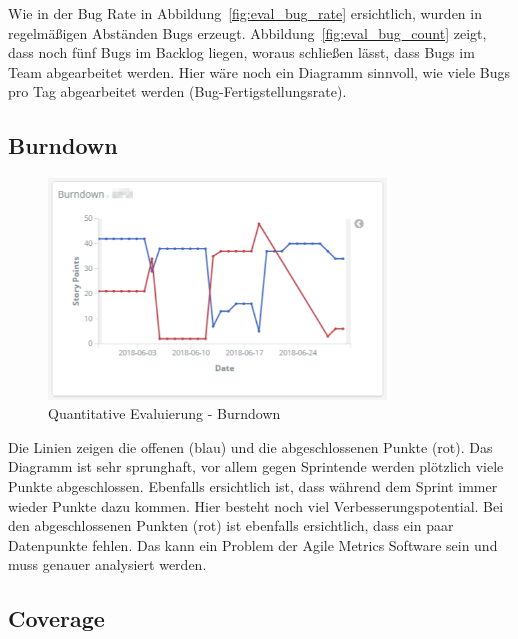 Wie in der Bug Rate in Abbildung~\ref{fig:eval_bug_rate} ersichtlich, wurden in regelmäßigen Abständen Bugs erzeugt.
Abbildung~\ref{fig:eval_bug_count} zeigt, dass noch fünf Bugs im Backlog liegen, woraus schließen lässt, dass Bugs im Team abgearbeitet werden.
Hier wäre noch ein Diagramm sinnvoll, wie viele Bugs pro Tag abgearbeitet werden (Bug-Fertigstellungsrate).

\clearpage
\subsection*{Burndown}

\begin{savenotes}
    \begin{figure}[H]
      \centering
      \includegraphics[width=0.8\textwidth]{img/eval-burndown.png}
      \caption{Quantitative Evaluierung {-} Burndown}\label{fig:eval_burndown}
    \end{figure}
\end{savenotes}

Die Linien zeigen die offenen (blau) und die abgeschlossenen Punkte (rot).
Das Diagramm ist sehr sprunghaft, vor allem gegen Sprintende werden plötzlich viele Punkte abgeschlossen.
Ebenfalls ersichtlich ist, dass während dem Sprint immer wieder Punkte dazu kommen.
Hier besteht noch viel Verbesserungspotential. Bei den abgeschlossenen Punkten (rot) ist ebenfalls ersichtlich, dass ein paar Datenpunkte fehlen.
Das kann ein Problem der Agile Metrics Software sein und muss genauer analysiert werden.

\clearpage
\subsection*{Coverage}

